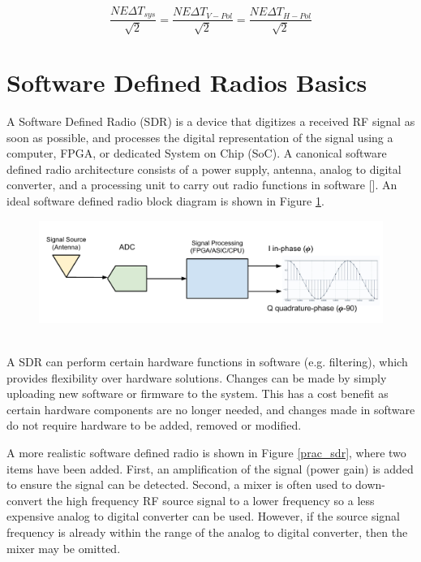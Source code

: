 \begin{equation}\label{correlating_neat}
\frac{NE\Delta T_{sys}}{\sqrt{2}} = \frac{NE\Delta T_{V-Pol}}{\sqrt{2}} = \frac{NE\Delta T_{H-Pol}}{\sqrt{2}}
\end{equation}
 
\section{Software Defined Radios Basics} 
A Software Defined Radio (SDR) is a device that digitizes a received RF signal as soon as possible, and processes the digital representation of the signal using a computer, FPGA, or dedicated System on Chip (SoC).  A canonical software defined radio architecture consists of a power supply, antenna, analog to digital converter, and a processing unit to carry out radio functions in software [\cite{Mitola1995}]. An ideal software defined radio block diagram is shown in Figure \ref{ideal_sdr}.

{\begin{figure}[h!tb] 
\centering
\includegraphics[width=\textwidth]{Images/SDR_Ideal_block.pdf}
\label{ideal_sdr}
\end{figure}
}
\ \\

A SDR can perform certain hardware functions in software (e.g. filtering), which provides flexibility over hardware solutions.  Changes can be made by simply uploading new software or firmware to the system.  This has a cost benefit as certain hardware components are no longer needed, and changes made in software do not require hardware to be added, removed or modified.

A more realistic software defined radio is shown in Figure \ref{prac_sdr}, where two items have been added.  First, an amplification of the signal (power gain) is added to ensure the signal can be detected.  Second, a mixer is often used to down-convert the high frequency RF source signal to a lower frequency so a less expensive analog to digital converter can be used.  However, if the source signal frequency is already within the range of the analog to digital converter, then the mixer may be omitted.   

